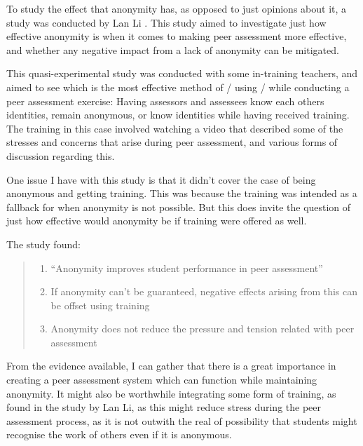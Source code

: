 \documentclass[a4paper,11pt]{report}
\begin{document}
To study the effect that anonymity has, as opposed to just opinions about it, a study was conducted by Lan Li \cite{li_role_2016}. This study aimed to investigate just how effective anonymity is when it comes to making peer assessment more effective, and whether any negative impact from a lack of anonymity can be mitigated.\par
This quasi-experimental study was conducted with some in-training teachers, and aimed to see which is the most effective method of / using / while conducting a peer assessment exercise: Having assessors and assessees know each others identities, remain anonymous, or know identities while having received training. The training in this case involved watching a video that described some of the stresses and concerns that arise during peer assessment, and various forms of discussion regarding this.\par
One issue I have with this study is that it didn't cover the case of being anonymous and getting training. This was because the training was intended as a fallback for when anonymity is not possible. But this does invite the question of just how effective would anonymity be if training were offered as well.\par
The study found:
\begin{quotation}
\begin{enumerate}
 \item ``Anonymity improves student performance in peer assessment''
 \item If anonymity can't be guaranteed, negative effects arising from this can be offset using training
 \item Anonymity does not reduce the pressure and tension related with peer assessment
\end{enumerate} 
\end{quotation}

From the evidence available, I can gather that there is a great importance in creating a peer assessment system which can function while maintaining anonymity. It might also be worthwhile integrating some form of training, as found in the study by Lan Li, as this might reduce stress during the peer assessment process, as it is not outwith the real of possibility that students might recognise the work of others even if it is anonymous.
\end{document}
